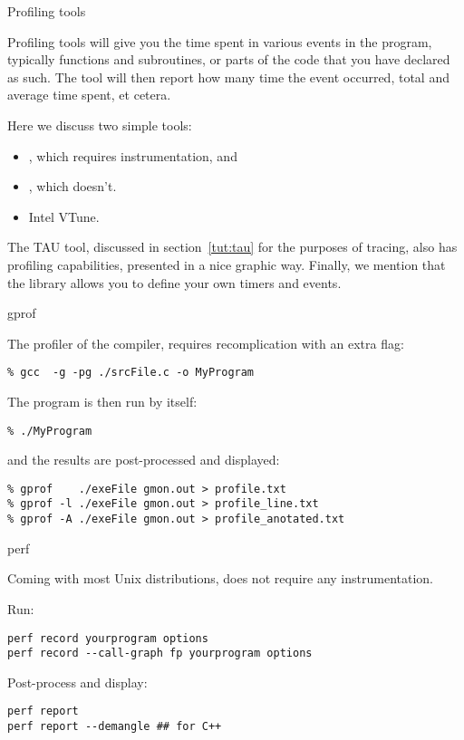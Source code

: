  {Profiling tools}

Profiling tools will give you the time spent in various events in the
program, typically functions and subroutines, or parts of the code
that you have declared as such. The tool will then report how many
time the event occurred, total and average time spent, et cetera.

Here we discuss two simple tools:
\begin{itemize}
\item {}, which requires instrumentation, and
\item {}, which doesn't.
\item Intel VTune.
\end{itemize}

The TAU tool, discussed in section~\ref{tut:tau} for the purposes of tracing,
also has profiling capabilities, presented in a nice graphic way.
Finally, we mention that the  library
allows you to define your own timers and events.

 {gprof}

The profiler of the  compiler, 
requires recomplication with an extra flag:

\begin{verbatim}
% gcc  -g -pg ./srcFile.c -o MyProgram
\end{verbatim}

The program is then run by itself:
\begin{verbatim}
% ./MyProgram
\end{verbatim}

and the results are post-processed and displayed:
\begin{verbatim}
% gprof    ./exeFile gmon.out > profile.txt
% gprof -l ./exeFile gmon.out > profile_line.txt
% gprof -A ./exeFile gmon.out > profile_anotated.txt
\end{verbatim}

 {perf}

Coming with most Unix distributions,
does not require any instrumentation.

Run:
\begin{verbatim}
perf record yourprogram options
perf record --call-graph fp yourprogram options
\end{verbatim}

Post-process and display:
\begin{verbatim}
perf report
perf report --demangle ## for C++
\end{verbatim}

